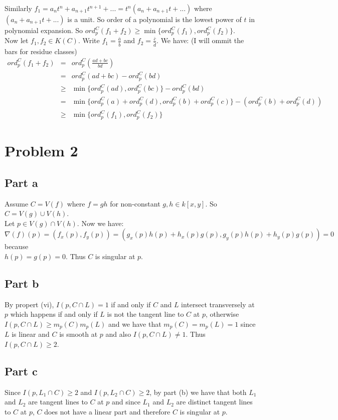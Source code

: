 \documentclass[12pt]{article}
\begin{document}
\begin{enumerate}
Similarly $f_1=a_nt^n+a_{n+1}t^{n+1}+...=t^n(a_n+a_{n+1}t+...)$ where 
$(a_n+a_{n+1}t+...)$  is a unit. So order of a polynomial is the lowest power of $t$ in polynomial expansion. So $ord_p^C(f_1+f_2) \ge \min \{ord_p^C(f_1),ord_p^C(f_2)\}$.\\
Now let $f_1,f_2 \in K(C)$. Write $f_1=\frac{\bar{a}}{\bar{b}}$ and $f_2=\frac{\bar{c}}{\bar{d}}$. We have: (I will ommit the bars for residue classes) 
\begin{eqnarray*}
ord_p^C(f_1+f_2) &=& ord_p^C(\frac{ad+bc}{bd}) \\ &=&
ord_p^C(ad+bc)-ord_p^C(bd) \\ &\ge &
\min \{ord_p^C(ad),ord_p^C(bc)\}-ord_p^C(bd)
\\ &=&
\min \{ord_p^C(a)+ord_p^C(d),ord_p^C(b)+ord_p^C(c)\}-(ord_p^C(b)+ord_p^C(d))
\\ &\ge &
\min \{ord_p^C(f_1),ord_p^C(f_2)\}
\end{eqnarray*}
\end{enumerate}


\clearpage
\section*{Problem 2}
\subsection*{Part a}
Assume $C=V(f)$ where $f=gh$ for non-constant $g,h \in k[x,y]$. 
So $C=V(g) \cup V(h)$. \\
Let $p \in V(g) \cap V(h)$. Now we have:\\
$\nabla(f)(p)=(f_x(p),f_y(p))=(g_x(p)h(p)+h_x(p)g(p),g_y(p)h(p)+h_y(p)g(p))=0$
because \\
$h(p)=g(p)=0$. Thus $C$ is singular at $p$.
\subsection*{Part b}
By propert (vi), $I(p,C \cap L)=1$ if and only if $C$ and $L$ intersect transversely at $p$ which happens if and only if $L$ is not the tangent line to $C$ at $p$, otherwise
$I(p,C \cap L) \ge m_p(C)m_p(L)$ and we have that $m_p(C)=m_p(L)=1$ since $L$ is linear and $C$ is smooth at $p$ and also $I(p,C \cap L) \not=1$. Thus
$I(p,C \cap L) \ge 2$.
\subsection*{Part c}
Since $I(p,L_1 \cap C) \ge 2$ and $I(p,L_2 \cap C) \ge 2$, by part (b) we have that both $L_1$ and $L_2$ are tangent lines to $C$ at $p$ and since $L_1$ and $L_2$ are distinct tangent lines to $C$ at $p$, $C$ does not have a linear part and therefore $C$ is singular at $p$.
\end{document}
